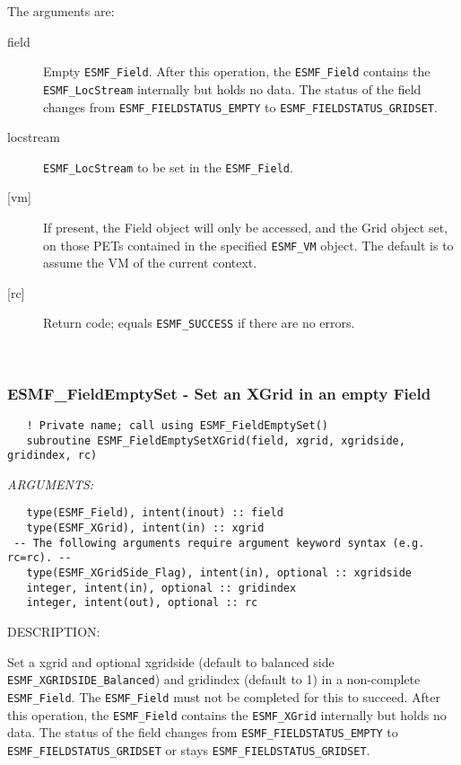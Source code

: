   
   The arguments are:
   \begin{description}
   \item [field]
   \begin{sloppypar}
   Empty {\tt ESMF\_Field}. After this
   operation, the {\tt ESMF\_Field} contains
   the {\tt ESMF\_LocStream} internally but holds no data.
   The status of the field changes from
   {\tt ESMF\_FIELDSTATUS\_EMPTY} to {\tt ESMF\_FIELDSTATUS\_GRIDSET}.
   \end{sloppypar}
   \item [locstream]
   {\tt ESMF\_LocStream} to be set in the {\tt ESMF\_Field}.
   \item[{[vm]}]
   If present, the Field object will only be accessed, and the Grid object
   set, on those PETs contained in the specified {\tt ESMF\_VM} object.
   The default is to assume the VM of the current context.
   \item [{[rc]}]
   Return code; equals {\tt ESMF\_SUCCESS} if there are no errors.
   \end{description}
   
 
\mbox{}\hrulefill\ 
 
\subsubsection [ESMF\_FieldEmptySet] {ESMF\_FieldEmptySet - Set an XGrid in an empty Field}


\begin{verbatim}   ! Private name; call using ESMF_FieldEmptySet()
   subroutine ESMF_FieldEmptySetXGrid(field, xgrid, xgridside, gridindex, rc)\end{verbatim}{\em ARGUMENTS:}
\begin{verbatim}   type(ESMF_Field), intent(inout) :: field
   type(ESMF_XGrid), intent(in) :: xgrid
 -- The following arguments require argument keyword syntax (e.g. rc=rc). --
   type(ESMF_XGridSide_Flag), intent(in), optional :: xgridside
   integer, intent(in), optional :: gridindex
   integer, intent(out), optional :: rc\end{verbatim}
{\sf DESCRIPTION:\\ }


   \begin{sloppypar}
   Set a xgrid and optional xgridside (default to balanced side
   {\tt ESMF\_XGRIDSIDE\_Balanced}) and gridindex (default to 1)
   in a non-complete {\tt ESMF\_Field}. The
   {\tt ESMF\_Field} must not be completed for this to succeed. After this
   operation, the {\tt ESMF\_Field} contains
   the {\tt ESMF\_XGrid} internally but holds no data.
   The status of the field changes from
   {\tt ESMF\_FIELDSTATUS\_EMPTY} to {\tt ESMF\_FIELDSTATUS\_GRIDSET}
   or stays {\tt ESMF\_FIELDSTATUS\_GRIDSET}.
  
   \end{sloppypar}
  
